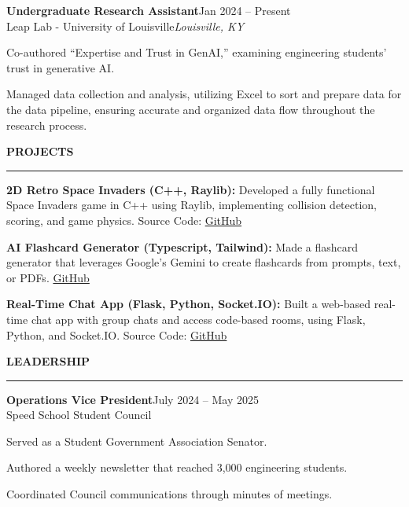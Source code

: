 \documentclass[11pt,letterpaper]{article}
\renewenvironment{itemize}{%
  \begin{list}{\textbullet}{%
    \setlength{\leftmargin}{1.5em}%
    \setlength{\topsep}{5pt}%
    \setlength{\itemsep}{3pt}%
    \setlength{\parsep}{0pt}%
    \setlength{\partopsep}{0pt}}%
}{\end{list}}
\newcommand{\resumesection}[1]{%
  \par\addvspace{10pt}%
  {\large\bfseries #1}\par\vspace{2pt}\hrule\vspace{5pt}}
\newcommand{\role}[4]{%
  \textbf{#1}\hfill #2\\%
  #3\hfill\textit{#4}\par}
\newcommand{\project}[2]{\textbf{#1} #2\par\vspace{6pt}}
\begin{document}
\role{Undergraduate Research Assistant}{Jan 2024 -- Present}
  {Leap Lab - University of Louisville}{Louisville, KY}
\begin{itemize}
  \item Co-authored ``Expertise and Trust in GenAI,'' examining engineering students' trust in generative AI.
  \item Managed data collection and analysis, utilizing Excel to sort and prepare data for the data pipeline, ensuring accurate and organized data flow throughout the research process.
\end{itemize}

\resumesection{PROJECTS}
\project{2D Retro Space Invaders (C++, Raylib):}{Developed a fully functional Space Invaders game in C++ using Raylib, implementing collision detection, scoring, and game physics. Source Code: \href{https://github.com/alwnraj/Space-invaders}{GitHub}}
\project{AI Flashcard Generator (Typescript, Tailwind):}{Made a flashcard generator that leverages Google's Gemini to create flashcards from prompts, text, or PDFs. \href{https://github.com/alwnraj/MLS-binary-search}{GitHub}}
\project{Real-Time Chat App (Flask, Python, Socket.IO):}{Built a web-based real-time chat app with group chats and access code-based rooms, using Flask, Python, and Socket.IO. Source Code: \href{https://github.com/alwnraj/chat-app}{GitHub}}
\vspace{-6pt}

\resumesection{LEADERSHIP}
\role{Operations Vice President}{July 2024 -- May 2025}
  {Speed School Student Council}{}
\begin{itemize}
  \item Served as a Student Government Association Senator.
  \item Authored a weekly newsletter that reached 3,000 engineering students.
  \item Coordinated Council communications through minutes of meetings.
\end{itemize}
\end{document}
